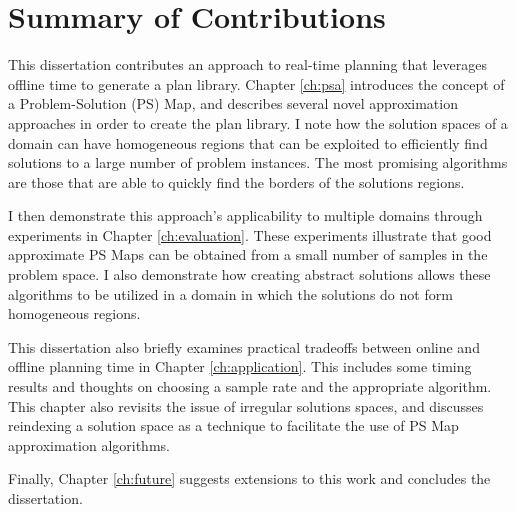 \section{Summary of Contributions}

This dissertation contributes an approach to real-time planning that leverages offline time to generate a plan library.  Chapter \ref{ch:psa} introduces the concept of a Problem-Solution (PS) Map, and describes several novel approximation approaches in order to create the plan library.  I note how the solution spaces of a domain can have homogeneous regions that can be exploited to efficiently find solutions to a large number of problem instances. The most promising algorithms are those that are able to quickly find the borders of the solutions regions.

I then demonstrate this approach's applicability to multiple domains through experiments in Chapter \ref{ch:evaluation}.  These experiments illustrate that good approximate PS Maps can be obtained from a small number of samples in the problem space.  I also demonstrate how creating abstract solutions allows these algorithms to be  utilized in a domain in which the solutions do not form homogeneous regions.

This dissertation also briefly examines practical tradeoffs between online and offline planning time in Chapter \ref{ch:application}.  This includes some timing results and thoughts on choosing a sample rate and the appropriate algorithm. This chapter also revisits the issue of irregular solutions spaces, and discusses reindexing a solution space as a technique to facilitate the use of PS Map approximation algorithms.

Finally, Chapter \ref{ch:future} suggests extensions to this work and concludes the dissertation.



